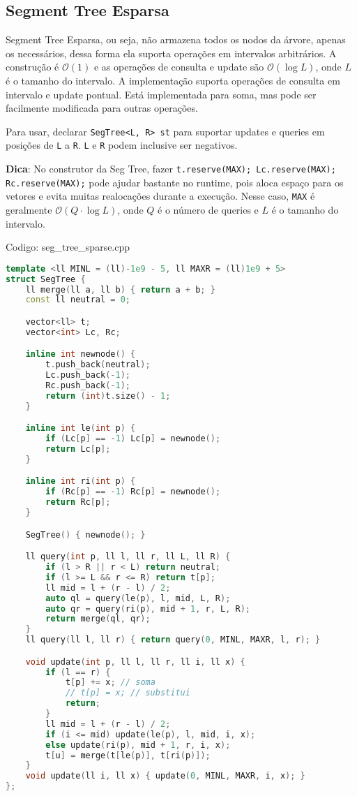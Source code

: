 \documentclass[10pt, a4paper, oneside]{book}
\begin{document}
\subsection{Segment Tree Esparsa}


Segment Tree Esparsa, ou seja, não armazena todos os nodos da árvore, apenas os necessários, dessa forma ela suporta operações em intervalos arbitrários. A construção é $\mathcal{O}(1)$ e as operações de consulta e update são $\mathcal{O}(\log L)$, onde $L$ é o tamanho do intervalo. A implementação suporta operações de consulta em intervalo e update pontual. Está implementada para soma, mas pode ser facilmente modificada para outras operações. 



Para usar, declarar \texttt{SegTree<L, R> st} para suportar updates e queries em posições de \texttt{L} a \texttt{R}. \texttt{L} e \texttt{R} podem inclusive ser negativos.



\textbf{Dica}: No construtor da Seg Tree, fazer \texttt{t.reserve(MAX); Lc.reserve(MAX); Rc.reserve(MAX);} pode ajudar bastante no runtime, pois aloca espaço para os vetores e evita muitas realocações durante a execução. Nesse caso, \texttt{MAX} é geralmente $\mathcal{O}(Q \cdot \log L)$, onde $Q$ é o número de queries e $L$ é o tamanho do intervalo.
\hfill

Codigo: seg\_tree\_sparse.cpp

\begin{lstlisting}[language=C++]
template <ll MINL = (ll)-1e9 - 5, ll MAXR = (ll)1e9 + 5>
struct SegTree {
    ll merge(ll a, ll b) { return a + b; }
    const ll neutral = 0;

    vector<ll> t;
    vector<int> Lc, Rc;

    inline int newnode() {
        t.push_back(neutral);
        Lc.push_back(-1);
        Rc.push_back(-1);
        return (int)t.size() - 1;
    }

    inline int le(int p) {
        if (Lc[p] == -1) Lc[p] = newnode();
        return Lc[p];
    }

    inline int ri(int p) {
        if (Rc[p] == -1) Rc[p] = newnode();
        return Rc[p];
    }

    SegTree() { newnode(); }

    ll query(int p, ll l, ll r, ll L, ll R) {
        if (l > R || r < L) return neutral;
        if (l >= L && r <= R) return t[p];
        ll mid = l + (r - l) / 2;
        auto ql = query(le(p), l, mid, L, R);
        auto qr = query(ri(p), mid + 1, r, L, R);
        return merge(ql, qr);
    }
    ll query(ll l, ll r) { return query(0, MINL, MAXR, l, r); }

    void update(int p, ll l, ll r, ll i, ll x) {
        if (l == r) {
            t[p] += x; // soma
            // t[p] = x; // substitui
            return;
        }
        ll mid = l + (r - l) / 2;
        if (i <= mid) update(le(p), l, mid, i, x);
        else update(ri(p), mid + 1, r, i, x);
        t[u] = merge(t[le(p)], t[ri(p)]);
    }
    void update(ll i, ll x) { update(0, MINL, MAXR, i, x); }
};\end{lstlisting}
\hfill
\end{document}
